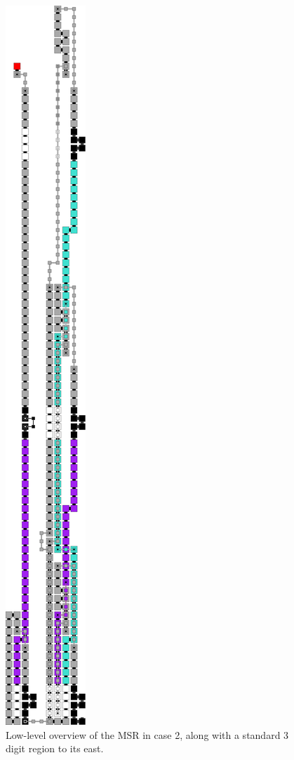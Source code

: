 \documentclass[10pt]{article}
\begin{document}
\begin{figure}
    \centering

    \includegraphics[width=.5in,valign=t]{2digit_msr_seed}

    \caption{\label{fig:2digit_msr_seed} Low-level overview of the MSR in case 2, along with a standard 3 digit region to its east.}

\end{figure}



\end{document}
